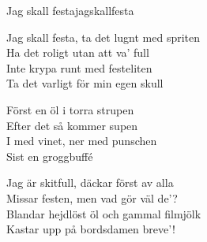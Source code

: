 \begin{song}{Jag skall festa}{jagskallfesta}
\begin{vers}
Jag skall festa, ta det lugnt med spriten\\
Ha det roligt utan att va' full\\
Inte krypa runt med festeliten\\
Ta det varligt för min egen skull\\
\end{vers}
\begin{vers}
Först en öl i torra strupen\\
Efter det så kommer supen\\
I med vinet, ner med punschen\\
Sist en groggbuffé\\
\end{vers}
\begin{vers}
Jag är skitfull, däckar först av alla\\
Missar festen, men vad gör väl de'?\\
Blandar hejdlöst öl och gammal filmjölk\\
Kastar upp på bordsdamen breve'!\\
\end{vers}
\end{song}
